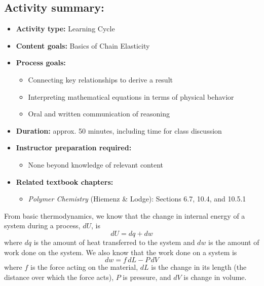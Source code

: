 \begin{activity}
\begin{instructornotes}
	\subsection*{Activity summary:}
	\begin{itemize}
		\item \textbf{Activity type:} Learning Cycle
		\item \textbf{Content goals:} Basics of Chain Elasticity
		\item \textbf{Process goals:} %
			\begin{itemize}
				\item Connecting key relationships to derive a result
				\item Interpreting mathematical equations in terms of physical behavior
				\item Oral and written communication of reasoning
			\end{itemize}
		\item \textbf{Duration:} approx. 50 minutes, including time for class discussion
		\item \textbf{Instructor preparation required:} 
			\begin{itemize}
				\item None beyond knowledge of relevant content
			\end{itemize}
		\item \textbf{Related textbook chapters:}
			\begin{itemize}
				\item \emph{Polymer Chemistry} (Hiemenz \& Lodge): Sections 6.7, 10.4, and 10.5.1
			\end{itemize}
	\end{itemize}

\end{instructornotes}


\begin{model}
\label{\labelbase:mdl:delG}

	From basic thermodynamics, we know that the change in internal energy of a system during a process, $dU$, is
	\begin{equation*}
		dU = dq + dw
	\end{equation*}
	where $dq$ is the amount of heat transferred to the system and $dw$ is the amount of work done on the system.  We also know that the work done on a system is
	\begin{equation*}
		dw = f\,dL - P\,dV
	\end{equation*}
	where $f$ is the force acting on the material, $dL$ is the change in its length (the distance over which the force acts), $P$ is pressure, and $dV$ is change in volume.
	

\end{model}
\end{activity}
